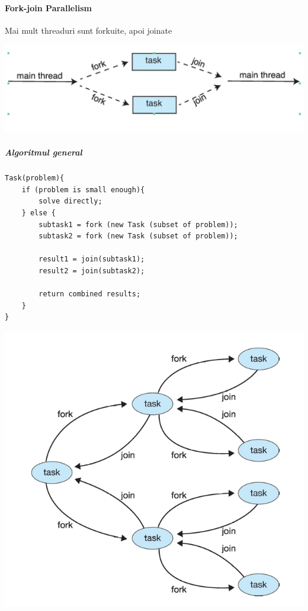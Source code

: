 \documentclass{article}
\begin{document}
\paragraph*{Fork-join Parallelism} Mai mult threaduri sunt forkuite, apoi joinate

\begin{center}
    \includegraphics[scale=0.3]{9_forkjoin.png}
\end{center}

\subparagraph*{Algoritmul general}
\begin{center}
    \begin{lstlisting}
Task(problem){
    if (problem is small enough){
        solve directly;
    } else {
        subtask1 = fork (new Task (subset of problem));
        subtask2 = fork (new Task (subset of problem));

        result1 = join(subtask1);
        result2 = join(subtask2);

        return combined results;
    }
}
    \end{lstlisting}
\end{center}

\begin{center}
    \includegraphics[scale=0.3]{10_forkjoin.png}
\end{center}
\end{document}
